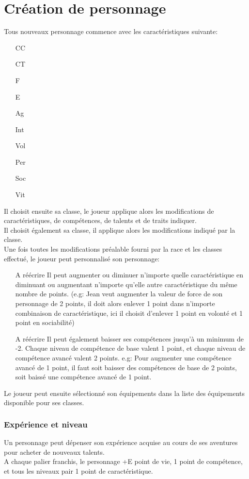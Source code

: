 \part{Création de personnage}

Tous nouveaux personnage commence avec les caractéristiques suivante:
\begin{itemize}
\item[CC]
\item[CT]
\item[F]
\item[E]
\item[Ag]
\item[Int]
\item[Vol]
\item[Per]
\item[Soc]
\item[Vit]
\end{itemize}

Il choisit ensuite sa classe, le joueur applique alors les modifications de caractéristiques, de compétences, de talents et de traits indiquer. \\
Il choisit également sa classe, il applique alors les modifications indiqué par la classe. \\

Une fois toutes les modifications préalable fourni par la race et les classes effectué, le joueur peut personnalisé son personnage:
\begin{itemize}
\item [A réécrire]Il peut augmenter ou diminuer n'importe quelle caractéristique en diminuant ou augmentant n'importe qu'elle autre caractéristique du même nombre de points. (e.g: Jean veut augmenter la valeur de force de son personnage de 2 points, il doit alors enlever 1 point dans n'importe combinaison de caractéristique, ici il choisit d'enlever 1 point en volonté et 1 point en sociabilité)
\item [A réécrire] Il peut également baisser ses compétences jusqu'à un minimum de -2. Chaque niveau de compétence de base valent 1 point, et chaque niveau de compétence avancé valent 2 points. e.g: Pour augmenter une compétence avancé de 1 point, il faut soit baisser des compétences de base de 2 points, soit baissé une compétence avancé de 1 point.
\end{itemize}

Le joueur peut ensuite sélectionné son équipements dans la liste des équipements disponible pour ses classes.




\section{Expérience et niveau}
Un personnage peut dépenser son expérience acquise au cours de ses aventures pour acheter de nouveaux talents. \\
A chaque palier franchis, le personnage +E point de vie, 1 point de compétence, et tous les niveaux pair 1 point de caractéristique.